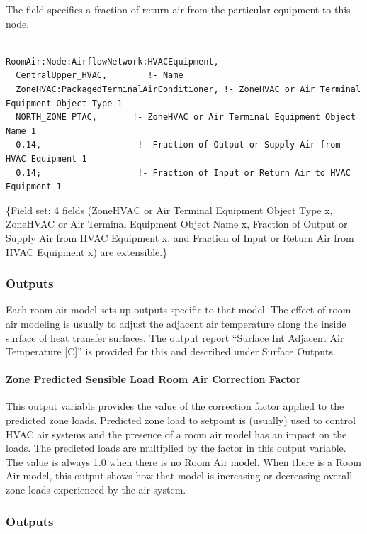 The field specifies a fraction of return air from the particular equipment to this node.

\begin{lstlisting}

RoomAir:Node:AirflowNetwork:HVACEquipment,
  CentralUpper_HVAC,        !- Name
  ZoneHVAC:PackagedTerminalAirConditioner, !- ZoneHVAC or Air Terminal Equipment Object Type 1
  NORTH_ZONE PTAC,       !- ZoneHVAC or Air Terminal Equipment Object Name 1
  0.14,                   !- Fraction of Output or Supply Air from HVAC Equipment 1 
  0.14;                   !- Fraction of Input or Return Air to HVAC Equipment 1
\end{lstlisting}

\{Field set: 4 fields (ZoneHVAC or Air Terminal Equipment Object Type x, ZoneHVAC or Air Terminal Equipment Object Name x, Fraction of Output or Supply Air from HVAC Equipment x, and Fraction of Input or Return Air from HVAC Equipment x) are extensible.\}

\subsubsection{Outputs}\label{outputs-1-023}

Each room air model sets up outputs specific to that model. The effect of room air modeling is usually to adjust the adjacent air temperature along the inside surface of heat transfer surfaces. The output report ``Surface Int Adjacent Air Temperature {[}C{]}'' is provided for this and described under Surface Outputs.

\paragraph{Zone Predicted Sensible Load Room Air Correction Factor}\label{zone-predicted-sensible-load-room-air-correction-factor}

This output variable provides the value of the correction factor applied to the predicted zone loads. Predicted zone load to setpoint is (usually) used to control HVAC air systems and the presence of a room air model has an impact on the loads. The predicted loads are multiplied by the factor in this output variable. The value is always 1.0 when there is no Room Air model. When there is a Room Air model, this output shows how that model is increasing or decreasing overall zone loads experienced by the air system.

\subsubsection{Outputs}\label{outputs-2-019}

